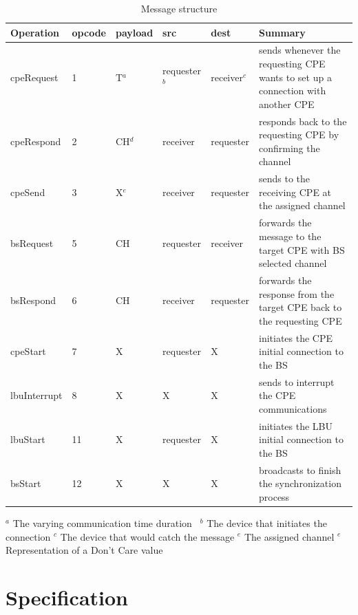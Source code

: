 \begin{table}[ht]
\centering
    \begin{tabular}{ | l | l | l | l | l | p{4cm} |}
    \hline
    Operation & opcode & payload & src & dest & Summary \\ \hline
    cpeRequest & 1 & T$^a$  & requester$^b$  & receiver$^c$ & sends whenever the requesting CPE wants to set up a connection with another CPE \\ \hline
    cpeRespond & 2 & CH$^d$ & receiver & requester & responds back to the requesting CPE by confirming the channel\\ \hline
    cpeSend & 3 & X$^e$ & receiver & requester & sends to the receiving CPE at the assigned channel \\ \hline
    bsRequest & 5 & CH & requester & receiver & forwards the message to the target CPE with BS selected channel\\ \hline
    bsRespond & 6 & CH & receiver & requester & forwards the response from the target CPE back to the requesting CPE\\ \hline
    cpeStart & 7 & X & requester & X & initiates the CPE initial connection to the BS\\ \hline
    lbuInterrupt & 8 & X & X & X & sends to interrupt the CPE communications \\ \hline
    lbuStart & 11 & X & requester & X & initiates the LBU initial connection to the BS \\ \hline
    bsStart & 12 & X & X & X & broadcasts to finish the synchronization process\\ \hline
    \hline
    \end{tabular}
\footnotesize{
$^a$ The varying communication time duration \
$^b$ The device that initiates the connection 
$^c$ The device that would catch the message 
$^e$ The assigned channel 
$^e$ Representation of a Don't Care value}\\
\caption{Message structure}
\label{tab:structure}
\end{table}


\chapter{Specification}

